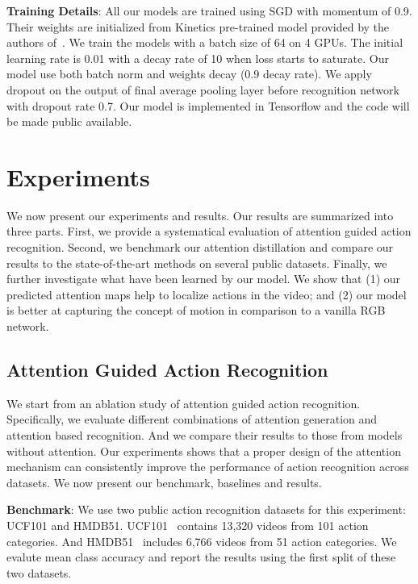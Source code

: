 \documentclass[10pt,twocolumn,letterpaper]{article}
\begin{document}
\noindent \textbf{Training Details}:
All our models are trained using SGD with momentum of 0.9. Their weights are initialized from Kinetics pre-trained model provided by the authors of~\cite{carreira2017quo}. We train the models with a batch size of 64 on 4 GPUs. The initial learning rate is 0.01 with a decay rate of 10 when loss starts to saturate. Our model use both batch norm and weights decay (0.9 decay rate). We apply dropout on the output of final average pooling layer before recognition network with dropout rate 0.7. Our model is implemented in Tensorflow and the code will be made public available.

\section{Experiments}
We now present our experiments and results. Our results are summarized into three parts. First, we provide a systematical evaluation of attention guided action recognition. Second, we benchmark our attention distillation and compare our results to the state-of-the-art methods on several public datasets. Finally, we further investigate what have been learned by our model. We show that (1) our predicted attention maps help to localize actions in the video; and (2) our model is better at capturing the concept of motion in comparison to a vanilla RGB network.  

\subsection{Attention Guided Action Recognition}
We start from an ablation study of attention guided action recognition. Specifically, we evaluate different combinations of attention generation and attention based recognition. And we compare their results to those from models without attention. Our experiments shows that a proper design of the attention mechanism can consistently improve the performance of action recognition across datasets. We now present our benchmark, baselines and results. 

\noindent \textbf{Benchmark}: We use two public action recognition datasets for this experiment: UCF101 and HMDB51. UCF101~\cite{Soomro2012UCF101AD} contains 13,320 videos from 101 action categories. And HMDB51~\cite{kuehne2011hmdb} includes 6,766 videos from 51 action categories. We evalute mean class accuracy and report the results using the first split of these two datasets. 
\end{document}
